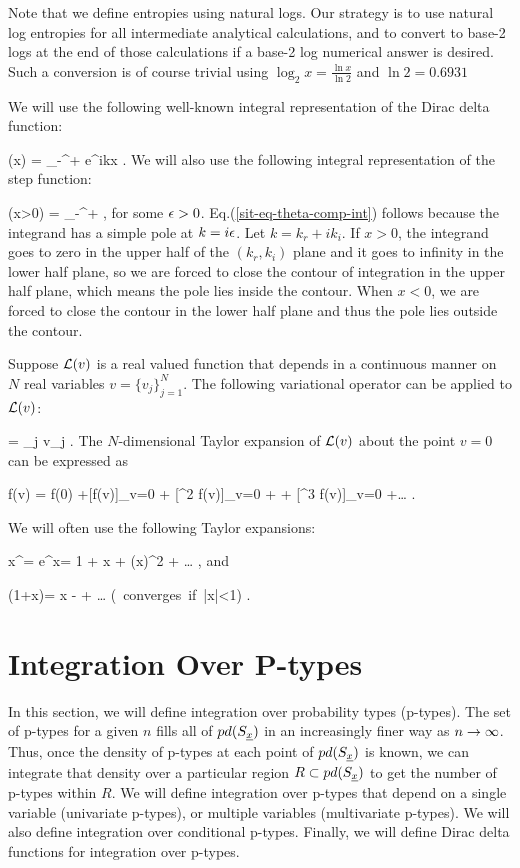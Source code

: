 Note that we
define entropies
using natural logs. Our
strategy is to
use natural log entropies
for all intermediate analytical
calculations, and to
convert
to base-2 logs
at the end of those
calculations if
a base-2 log numerical answer
is desired. Such a conversion is
of course trivial
using $\log_2 x = \frac{\ln x}{\ln 2}$ and
$\ln 2 = 0.6931$


We  will use
the following well-known integral representation
of the Dirac delta function:

\beq
\delta(x) =
\int_{-\infty}^{+\infty}
\;\;  e^{ikx}
\;.
\eeq
We will also use the following
 integral
representation
of the step function:

\beq
\theta(x>0) =
\int_{-\infty}^{+\infty}
\;\;
\;,\label{sit-eq-theta-comp-int}
\eeq
for some $\epsilon>0$.
Eq.(\ref{sit-eq-theta-comp-int})
follows
because the integrand
has a simple pole at $k=i\epsilon$.
Let $k = k_r + i k_i$.
If $x>0$,
the integrand goes to zero
in the upper
half of the $(k_r,k_i)$ plane
and it goes to infinity
in the lower half plane, so we
are forced to close the contour
of integration in the upper half plane,
which means the pole lies inside the contour.
When $x<0$,
we are forced to close the contour in the lower
half plane and thus the pole lies outside
the contour.

Suppose ${\cal L}(v)$
is a real valued
function
that depends in a continuous
manner on $N$
real variables $v=\{v_j\}_{j=1}^N$.
The following variational
operator can be applied to ${\cal L}(v)$:

\beq
\delta= \sum_j \delta v_j
\;.
\eeq
The $N$-dimensional Taylor
expansion of ${\cal L}(v)$
about the point $v=0$ can be expressed as

\beq
f(v) = f(0) +[\delta f(v)]_{v=0} +
[\delta^2 f(v)]_{v=0} + +
[\delta^3 f(v)]_{v=0} +\ldots
\;.
\eeq



We will often use the following
Taylor expansions:

\beq
x^\eps = e^{\eps\ln x}= 1 + \eps \ln x +
(\eps \ln x)^2 + \ldots
\;,
\label{sit-eq-taylor-one}
\eeq
and

\beq
\ln(1+x)= x -  + \ldots
\; (\mbox{ converges if }|x|<1)
\;.
\label{sit-eq-taylor-two}
\eeq




\section{Integration Over P-types}
In this section, we will define
integration over probability types (p-types).
The set of p-types for a
given $n$
fills all of
$pd(S_{\underline{x}})$
in an increasingly
finer way as $n\rightarrow \infty$. Thus, once
the density
of p-types at
each
point of $pd(S_{\underline{x}})$ is known,
we can integrate that density
 over
a particular region $R\subset pd(S_{\underline{x}})$
to get the
number of p-types
within $R$.
We will define
integration over p-types
that depend on a single
variable (univariate p-types),
or multiple variables (multivariate p-types).
We will also define integration over
conditional p-types.
Finally, we will define Dirac
delta functions for integration
over p-types.


